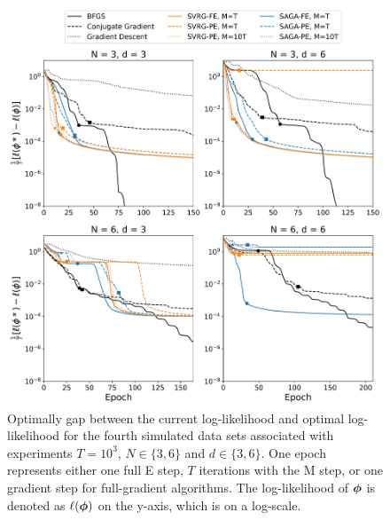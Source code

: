 \documentclass[12pt]{article}
\begin{document}
\begin{figure}[H]
    \centering
    \includegraphics[width=6.5in]{../plt/log-like_v_epoch_T-1000-003.png}
    \caption{Optimally gap between the current log-likelihood and optimal log-likelihood for the fourth simulated data sets associated with experiments $T=10^{3}$, $N \in \{3,6\}$ and $d \in \{3,6\}$. One epoch represents either one full E step, $T$ iterations with the M step, or one gradient step for full-gradient algorithms. The log-likelihood of $\boldsymbol{\phi}$ is denoted as $\ell(\boldsymbol{\phi})$ on the y-axis, which is on a log-scale.}
\end{figure}
%
\end{document}
